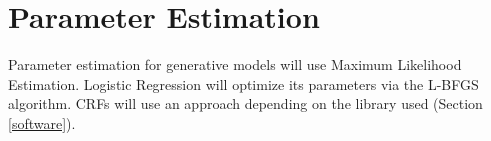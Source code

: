 \documentclass{article}
\begin{document}
%


\section{Parameter Estimation}
Parameter estimation for generative models will use Maximum Likelihood Estimation.
Logistic Regression will optimize its parameters via the L-BFGS algorithm.
CRFs will use an approach depending on the library used (Section \ref{software}).
\end{document}
